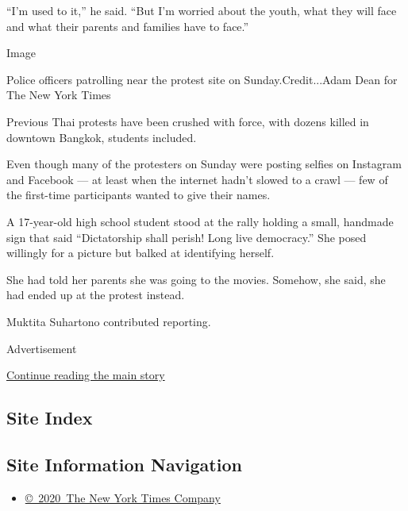 ``I'm used to it,'' he said. ``But I'm worried about the youth, what
they will face and what their parents and families have to face.''

Image

Police officers patrolling near the protest site on Sunday.Credit...Adam
Dean for The New York Times

Previous Thai protests have been crushed with force, with dozens killed
in downtown Bangkok, students included.

Even though many of the protesters on Sunday were posting selfies on
Instagram and Facebook --- at least when the internet hadn't slowed to a
crawl --- few of the first-time participants wanted to give their names.

A 17-year-old high school student stood at the rally holding a small,
handmade sign that said ``Dictatorship shall perish! Long live
democracy.'' She posed willingly for a picture but balked at identifying
herself.

She had told her parents she was going to the movies. Somehow, she said,
she had ended up at the protest instead.

Muktita Suhartono contributed reporting.

Advertisement

\protect\hyperlink{after-bottom}{Continue reading the main story}

\hypertarget{site-index}{%
\subsection{Site Index}\label{site-index}}

\hypertarget{site-information-navigation}{%
\subsection{Site Information
Navigation}\label{site-information-navigation}}

\begin{itemize}
\tightlist
\item
  \href{https://help.nytimes3xbfgragh.onion/hc/en-us/articles/115014792127-Copyright-notice}{©~2020~The
  New York Times Company}
\end{itemize}

